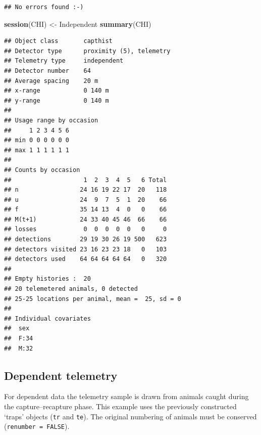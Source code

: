 \documentclass[
]{book}
\newenvironment{Shaded}{\begin{snugshade}}{\end{snugshade}}
\newcommand{\FunctionTok}[1]{\textcolor[rgb]{0.13,0.29,0.53}{\textbf{#1}}}
\newcommand{\NormalTok}[1]{#1}
\newcommand{\OtherTok}[1]{\textcolor[rgb]{0.56,0.35,0.01}{#1}}
\newcommand{\StringTok}[1]{\textcolor[rgb]{0.31,0.60,0.02}{#1}}
\begin{document}
\begin{verbatim}
## No errors found :-)
\end{verbatim}

\begin{Shaded}
\begin{Highlighting}[]
\FunctionTok{session}\NormalTok{(CHI) }\OtherTok{\textless{}{-}} \StringTok{\textquotesingle{}Independent\textquotesingle{}}
\FunctionTok{summary}\NormalTok{(CHI)}
\end{Highlighting}
\end{Shaded}

\begin{verbatim}
## Object class       capthist 
## Detector type      proximity (5), telemetry 
## Telemetry type     independent 
## Detector number    64 
## Average spacing    20 m 
## x-range            0 140 m 
## y-range            0 140 m 
## 
## Usage range by occasion
##     1 2 3 4 5 6
## min 0 0 0 0 0 0
## max 1 1 1 1 1 1
## 
## Counts by occasion 
##                    1  2  3  4  5   6 Total
## n                 24 16 19 22 17  20   118
## u                 24  9  7  5  1  20    66
## f                 35 14 13  4  0   0    66
## M(t+1)            24 33 40 45 46  66    66
## losses             0  0  0  0  0   0     0
## detections        29 19 30 26 19 500   623
## detectors visited 23 16 23 23 18   0   103
## detectors used    64 64 64 64 64   0   320
## 
## Empty histories :  20 
## 20 telemetered animals, 0 detected
## 25-25 locations per animal, mean =  25, sd = 0 
## 
## Individual covariates
##  sex   
##  F:34  
##  M:32
\end{verbatim}

\subsection{Dependent telemetry}\label{dependent-telemetry}

For dependent data the telemetry sample is drawn from animals caught during the capture--recapture phase. This example uses the previously constructed `traps' objects (\texttt{tr} and \texttt{te}). The original numbering of animals must be conserved (\texttt{renumber\ =\ FALSE}).
\end{document}
